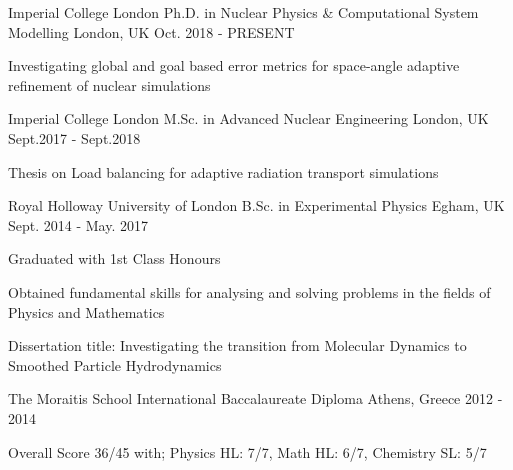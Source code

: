 \begin{cventries}
	\cventry
	{Imperial College London}
	{Ph.D. in Nuclear Physics \& Computational System Modelling}
	{London, UK}
	{Oct. 2018 - PRESENT}
	{
		\begin{cvitems}
			\item {Investigating global and goal based error metrics for
			            space-angle adaptive refinement of nuclear simulations}
		\end{cvitems}
	}
	\cventry
	{Imperial College London}
	{M.Sc. in Advanced Nuclear Engineering}
	{London, UK}
	{Sept.2017 - Sept.2018}
	{
		\begin{cvitems}
			\item {Thesis on Load balancing for adaptive radiation transport simulations}
		\end{cvitems}
	}

	\cventry
	{Royal Holloway University of London}
	{B.Sc. in Experimental Physics}
	{Egham, UK}
	{Sept. 2014 - May. 2017}
	{
		\begin{cvitems}
			\item {Graduated with 1st Class Honours}
			\item {Obtained fundamental skills for analysing and solving
			            problems in the fields of Physics and Mathematics}
			\item {Dissertation title: Investigating the transition from
			            Molecular Dynamics to Smoothed Particle Hydrodynamics}
		\end{cvitems}
	}

	\cventry
	{The Moraitis School}
	{International Baccalaureate Diploma}
	{Athens, Greece}
	{2012 - 2014}
	{
		\begin{cvitems}
			\item {Overall Score 36/45 with; Physics HL: 7/7, Math HL: 6/7, Chemistry SL: 5/7}
		\end{cvitems}
	}

\end{cventries}
